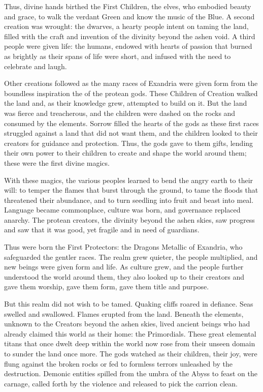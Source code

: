\documentclass[10pt,a4paper,twoside,bg=print,twocolumn,openany,nodeprecatedcode]{dndbook}
\begin{document}
Thus, divine hands birthed the First Children, the elves, who embodied beauty and grace, to walk the verdant Green and know the music of the Blue. A second creation was wrought: the dwarves, a hearty people intent on taming the land, filled with the craft and invention of the divinity beyond the ashen void. A third people were given life: the humans, endowed with hearts of passion that burned as brightly as their spans of life were short, and infused with the need to celebrate and laugh.

Other creations followed as the many races of Exandria were given form from the boundless inspiration the of the protean gods. These Children of Creation walked the land and, as their knowledge grew, attempted to build on it. But the land was fierce and treacherous, and the children were dashed on the rocks and consumed by the elements. Sorrow filled the hearts of the gods as these first races struggled against a land that did not want them, and the children looked to their creators for guidance and protection. Thus, the gods gave to them gifts, lending their own power to their children to create and shape the world around them; these were the first divine magics.

With these magics, the various peoples learned to bend the angry earth to their will: to temper the flames that burst through the ground, to tame the floods that threatened their abundance, and to turn seedling into fruit and beast into meal. Language became commonplace, culture was born, and governance replaced anarchy. The protean creators, the divinity beyond the ashen skies, saw progress and saw that it was good, yet fragile and in need of guardians.

Thus were born the First Protectors: the Dragons Metallic of Exandria, who safeguarded the gentler races. The realm grew quieter, the people multiplied, and new beings were given form and life. As culture grew, and the people further understood the world around them, they also looked up to their creators and gave them worship, gave them form, gave them title and purpose.

But this realm did not wish to be tamed. Quaking cliffs roared in defiance. Seas swelled and swallowed. Flames erupted from the land. Beneath the elements, unknown to the Creators beyond the ashen skies, lived ancient beings who had already claimed this world as their home: the Primordials. These great elemental titans that once dwelt deep within the world now rose from their unseen domain to sunder the land once more. The gods watched as their children, their joy, were flung against the broken rocks or fed to formless terrors unleashed by the destruction. Demonic entities spilled from the umbra of the Abyss to feast on the carnage, called forth by the violence and released to pick the carrion clean.
\end{document}
